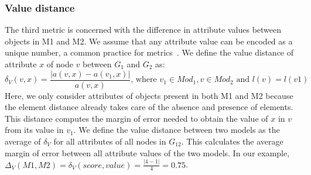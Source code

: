 \subsubsection{Value distance}
The third metric is concerned with the difference in attribute values between objects in M1 and M2.
We assume that any attribute value can be encoded as a unique number, a common practice for metrics~\cite{Bertoa2018}.
We define the value distance of attribute $x$ of node $v$ between $G_1$ and $G_2$ as:
\[
\delta_V(v,x)=\frac{|a(v,x)-a(v_1,x)|}{a(v,x)} \mbox{, where } v_1 \in Mod_1, v \in Mod_2 \mbox{ and } l(v)=l(v1)
\]
Here, we only consider attributes of objects present in both M1 and M2 because the element distance already takes care of the absence and presence of elements.
This distance computes the margin of error needed to obtain the value of $x$ in $v$ from its value in $v_1$.
We define the value distance between two models as the average of $\delta_V$ for all attributes of all nodes in $G_{12}$.
This calculates the average margin of error between all attribute values of the two models.
In our example, $\Delta_V(M1,M2)=\delta_V(score,value)=\frac{|4-1|}{4}=0.75$.

